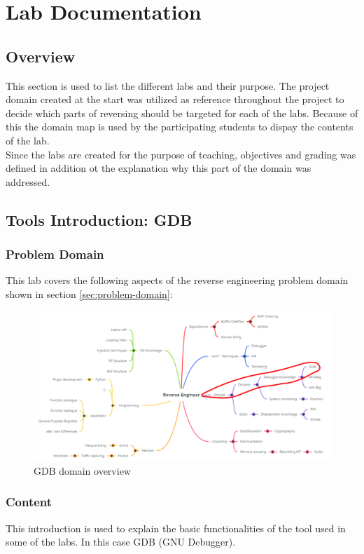 \section{Lab Documentation}
\subsection{Overview}
This section is used to list the different labs and their purpose. The project domain created at the start was utilized as reference throughout the project to decide which parts of reversing should be targeted for each of the labs. Because of this the domain map is used by the participating students to dispay the contents of the lab. \\ 
Since the labs are created for the purpose of teaching, objectives and grading was defined in addition ot the explanation why this part of the domain was addressed.
\newpage
\subsection{Tools Introduction: GDB}
\subsubsection*{Problem Domain}
This lab covers the following aspects of the reverse engineering problem domain shown in section \ref{sec:problem-domain}:
\vspace{-2ex}
\begin{figure}[H]
    \includegraphics[width=\textwidth]{resources/GDBIntro-overview-light.png}
    \caption{GDB domain overview}
    \label{fig:gdb-overview}
\end{figure}
\subsubsection*{Content}
This introduction is used to explain the basic functionalities of the tool used in some of the labs. In this case GDB (GNU Debugger).
